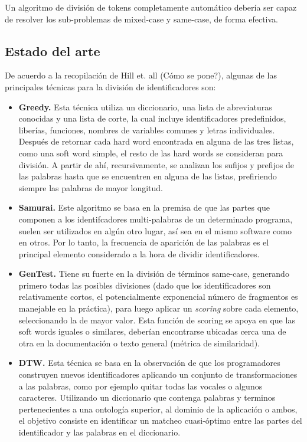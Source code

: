 Un algoritmo de división de tokens completamente automático debería ser capaz de resolver los sub-problemas de mixed-case y same-case, de forma efectiva.

\subsection{Estado del arte}
De acuerdo a la recopilación de Hill et. all (Cómo se pone?), algunas de las principales técnicas para la división de identificadores son:

\begin{itemize}
  \item \textbf{Greedy.} Esta técnica utiliza un diccionario, una lista de abreviaturas conocidas y una lista de corte, la cual incluye identificadores predefinidos, liberías, funciones, nombres de variables comunes y letras individuales. Después de retornar cada hard word encontrada en alguna de las tres listas, como una soft word simple, el resto de las hard words se consideran para división. A partir de ahí, recursivamente, se analizan los sufijos y prefijos de las palabras hasta que se encuentren en alguna de las listas, prefiriendo siempre las palabras de mayor longitud.
  
  \item \textbf{Samurai.} Este algoritmo se basa en la premisa de que las partes que componen a los identifcadores multi-palabras de un determinado programa, suelen ser utilizados en algún otro lugar, así sea en el mismo software como en otros. Por lo tanto, la frecuencia de aparición de las palabras es el principal elemento considerado a la hora de dividir identificadores.
  
  \item \textbf{GenTest.} Tiene su fuerte en la división de términos same-case, generando primero todas las posibles divisiones (dado que los identificadores son relativamente cortos, el potencialmente exponencial número de fragmentos es manejable en la práctica), para luego aplicar un \textit{scoring} sobre cada elemento, seleccionando la de mayor valor. Esta función de scoring se apoya en que las soft words iguales o similares, deberían encontrarse ubicadas cerca una de otra en la documentación o texto general (métrica de similaridad). 
  
  \item \textbf{DTW.} Esta técnica se basa en la observación de que los programadores construyen nuevos identificadores aplicando un conjunto de transformaciones a las palabras, como por ejemplo quitar todas las vocales o algunos caracteres. Utilizando un diccionario que contenga palabras y terminos pertenecientes a una ontología superior, al dominio de la aplicación o ambos, el objetivo consiste en identificar un matcheo cuasi-óptimo entre las partes del identificador y las palabras en el diccionario.
  

\end{itemize}
